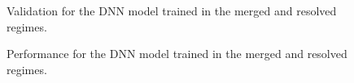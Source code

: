 \begin{figure}[ht]
      \centering
       \caption{Validation for the DNN model trained in the merged and resolved regimes.}
       \label{fig:ROCValidations}
\end{figure}

\begin{figure}[ht]
      \centering
       \caption{Performance for the DNN model trained in the merged and resolved regimes.}
       \label{fig:1lepDNN_performance}
\end{figure}

